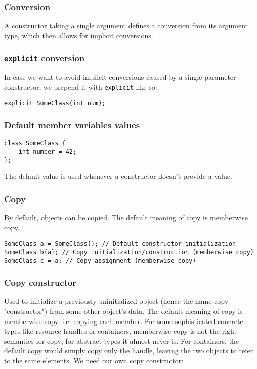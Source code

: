 \documentclass[8pt, table, xcdraw]{article}%
\begin{document}
\subsubsection{Conversion}

A constructor taking a single argument defines a conversion from its argument type, which then allows for implicit conversions.

\subsubsection{\lstinline{explicit} conversion}

In case we want to avoid implicit conversions caused by a single-parameter constructor, we prepend it with \lstinline{explicit} like so:

\begin{lstlisting}
explicit SomeClass(int num);
\end{lstlisting}

\subsubsection{Default member variables values}

\begin{lstlisting}
class SomeClass {
    int number = 42;
};
\end{lstlisting}

The default value is used whenever a constructor doesn’t provide a value.

\subsubsection{Copy}

By default, objects can be copied. The default meaning of copy is memberwise copy.

\begin{lstlisting}
SomeClass a = SomeClass(); // Default constructor initialization
SomeClass b{a}; // Copy initialization/construction (memberwise copy)
SomeClass c = a; // Copy assignment (memberwise copy)
\end{lstlisting}

\subsubsection{Copy constructor}

Used to initialize a previously uninitialized object (hence the name copy "constructor") from some other object's data. The default meaning of copy is memberwise copy, i.e. copying each member. For some sophisticated concrete types like resource handles or containers, memberwise copy is not the right semantics for copy; for abstract types it almost never is. For containers, the default copy would simply copy only the handle, leaving the two objects to refer to the same elements. We need our own copy constructor:
\end{document}
